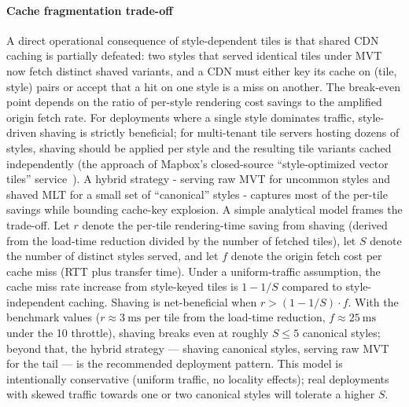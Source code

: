 \paragraph{Cache fragmentation trade-off}
A direct operational consequence of style-dependent tiles is that shared \ac{CDN} caching is partially defeated: two styles that served identical tiles under \ac{MVT} now fetch distinct shaved variants, and a \ac{CDN} must either key its cache on (tile, style) pairs or accept that a hit on one style is a miss on another.
The break-even point depends on the ratio of per-style rendering cost savings to the amplified origin fetch rate.
For deployments where a single style dominates traffic, style-driven shaving is strictly beneficial; for multi-tenant tile servers hosting dozens of styles, shaving should be applied per style and the resulting tile variants cached independently (the approach of Mapbox's closed-source \enquote{style-optimized vector tiles} service~\cite{StyleoptimizedVectorTiles}).
A hybrid strategy - serving raw \ac{MVT} for uncommon styles and shaved \ac{MLT} for a small set of \enquote{canonical} styles - captures most of the per-tile savings while bounding cache-key explosion.
A simple analytical model frames the trade-off.
Let $r$ denote the per-tile rendering-time saving from shaving (derived from the load-time reduction divided by the number of fetched tiles), let $S$ denote the number of distinct styles served, and let $f$ denote the origin fetch cost per cache miss (RTT plus transfer time).
Under a uniform-traffic assumption, the cache miss rate increase from style-keyed tiles is $1 - 1/S$ compared to style-independent caching.
Shaving is net-beneficial when $r > (1 - 1/S) \cdot f$.
With the benchmark values ($r \approx \qty{3}{\milli\second}$ per tile from the load-time reduction, $f \approx \qty{25}{\milli\second}$ under the \qty{10}{\Mbps} throttle), shaving breaks even at roughly $S \leq 5$ canonical styles; beyond that, the hybrid strategy --- shaving canonical styles, serving raw \ac{MVT} for the tail --- is the recommended deployment pattern.
This model is intentionally conservative (uniform traffic, no locality effects); real deployments with skewed traffic towards one or two canonical styles will tolerate a higher $S$.

